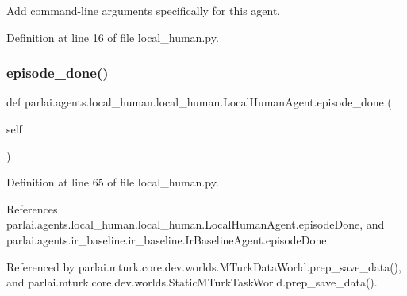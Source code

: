 \begin{DoxyVerb}Add command-line arguments specifically for this agent.\end{DoxyVerb}
 

Definition at line 16 of file local\+\_\+human.\+py.

\mbox{\label{classparlai_1_1agents_1_1local__human_1_1local__human_1_1LocalHumanAgent_a5c598c26dfd30db3120dac0cf02daf67}} 
\subsubsection{\texorpdfstring{episode\+\_\+done()}{episode\_done()}}
{\footnotesize\ttfamily def parlai.\+agents.\+local\+\_\+human.\+local\+\_\+human.\+Local\+Human\+Agent.\+episode\+\_\+done (\begin{DoxyParamCaption}\item[{}]{self }\end{DoxyParamCaption})}



Definition at line 65 of file local\+\_\+human.\+py.



References parlai.\+agents.\+local\+\_\+human.\+local\+\_\+human.\+Local\+Human\+Agent.\+episode\+Done, and parlai.\+agents.\+ir\+\_\+baseline.\+ir\+\_\+baseline.\+Ir\+Baseline\+Agent.\+episode\+Done.



Referenced by parlai.\+mturk.\+core.\+dev.\+worlds.\+M\+Turk\+Data\+World.\+prep\+\_\+save\+\_\+data(), and parlai.\+mturk.\+core.\+dev.\+worlds.\+Static\+M\+Turk\+Task\+World.\+prep\+\_\+save\+\_\+data().

